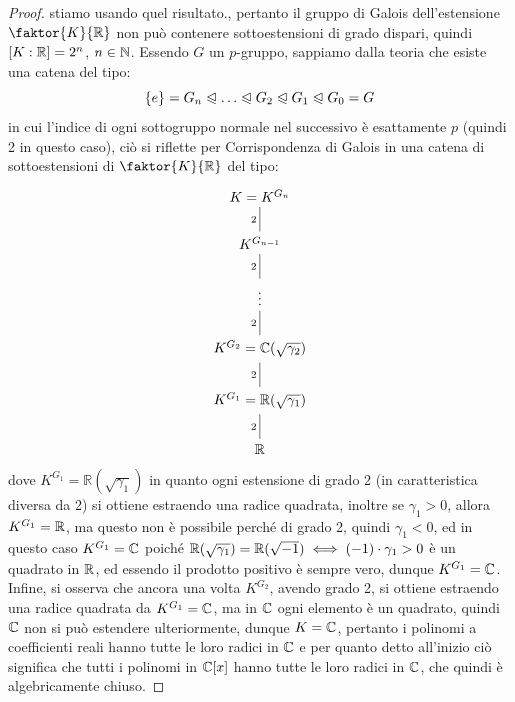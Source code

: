\documentclass[11pt]{scrartcl}
\begin{document}
\begin{proof}
{			stiamo usando quel risultato.}, pertanto il gruppo di Galois dell'estensione $\faktor{K}{\RR}$ non può contenere sottoestensioni di grado dispari, quindi $[K : \mathbb R] = 2^n$, $n \in \mathbb N$. Essendo $G$ un $p$-gruppo, sappiamo dalla teoria che esiste una catena del tipo:
		\[ \{e\} = G_n \trianglelefteqslant \ldots \trianglelefteqslant G_2 \trianglelefteqslant G_1 \trianglelefteqslant G_0 = G
		\]
		in cui l'indice di ogni sottogruppo normale nel successivo è esattamente $p$ (quindi 2 in questo caso), ciò si riflette per Corrispondenza di Galois in una catena di sottoestensioni di $\faktor{K}{\RR}$ del tipo:
		\[\begin{tikzcd}
			{K = K^{G_n}} \\
			{K^{G_{n-1}}} \\
			\vdots \\
			{K^{G_2} = \mathbb{C}(\sqrt{\gamma_2})} \\
			{K^{G_1} = \mathbb{R}(\sqrt{\gamma_1})} \\
			{\mathbb{R}}
			\arrow["2"', no head, from=1-1, to=2-1]
			\arrow["2"', no head, from=2-1, to=3-1]
			\arrow["2"', no head, from=3-1, to=4-1]
			\arrow["2"', no head, from=5-1, to=6-1]
			\arrow["2"', no head, from=4-1, to=5-1]
		\end{tikzcd}\]
		dove $K^{G_1} = \mathbb{R}(\sqrt{\gamma_1})$ in quanto ogni estensione di grado 2 (in caratteristica diversa da 2) si ottiene estraendo una radice quadrata, inoltre se $\gamma_1 > 0$, allora $K^{G_1} = \mathbb R$, ma questo non è possibile perché di grado 2, quindi $\gamma_1 < 0$, ed in questo caso $K^{G_1} = \mathbb C$ 
		poiché $\mathbb{R}(\sqrt{\gamma_1}) = \mathbb R(\sqrt{-1}) \iff (-1)\cdot \gamma_1 > 0 $ è un quadrato in $\mathbb R$, ed essendo il prodotto positivo è sempre vero, dunque $K^{G_1} = \mathbb C$. Infine, si osserva che ancora una volta $K^{G_2}$, avendo grado 2, si ottiene estraendo una radice quadrata da $K^{G_1} = \mathbb C$, ma in $\mathbb C$ ogni 
		elemento è un quadrato, quindi $\mathbb C$ non si può estendere ulteriormente, dunque $K = \mathbb C$, pertanto i polinomi a coefficienti reali hanno tutte le loro radici in $\mathbb C$ e per quanto detto all'inizio ciò significa che tutti i polinomi in $\mathbb C[x]$ hanno tutte le loro radici in $\mathbb C$, che quindi è algebricamente chiuso.
	\end{proof}
	
\end{document}

